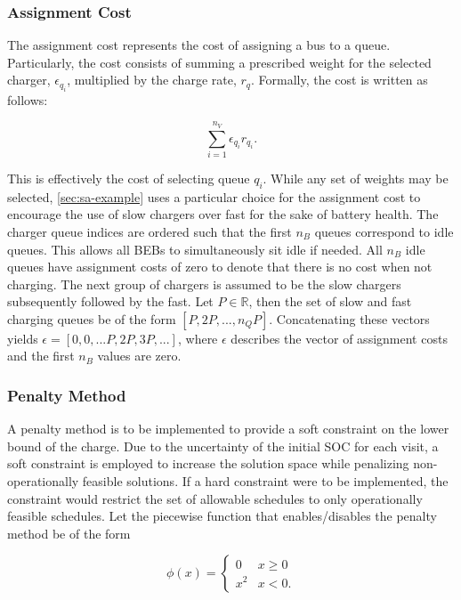 \documentclass[energies,article,submit,moreauthors]{Definitions/mdpi}
\begin{document}
\subsubsection{Assignment Cost}
\label{sec:sa-assignment-cost}
The assignment cost represents the cost of assigning a bus to a queue. Particularly, the cost consists of summing a
prescribed weight for the selected charger, \(\epsilon_{q_i}\), multiplied by the charge rate, \(r_q\). Formally, the cost is
written as follows:

\begin{equation}
\label{eq:assignment-cost}
\sum_{i=1}^{n_V} \epsilon_{q_i}r_{q_i}\text{.}
\end{equation}

This is effectively the cost of selecting queue \(q_i\). While any set of weights may be selected, \ref{sec:sa-example} uses a
particular choice for the assignment cost to encourage the use of slow chargers over fast for the sake of battery
health. The charger queue indices are ordered such that the first \(n_B\) queues correspond to idle queues. This allows
all BEBs to simultaneously sit idle if needed. All \(n_B\) idle queues have assignment costs of zero to denote that there
is no cost when not charging. The next group of chargers is assumed to be the slow chargers subsequently followed by the
fast. Let \(P \in \mathbb{R}\), then the set of slow and fast charging queues be of the form \([P, 2P, ..., n_QP]\). Concatenating
these vectors yields \(\epsilon = [0, 0, ... P, 2P, 3P, ...]\), where \(\epsilon\) describes the vector of assignment costs and the first
\(n_B\) values are zero.

\subsubsection{Penalty Method}
\label{sec:sa-penalty-method}
A penalty method is to be implemented to provide a soft constraint on the lower bound of the charge. Due to the
uncertainty of the initial SOC for each visit, a soft constraint is employed to increase the solution space while
penalizing non-operationally feasible solutions. If a hard constraint were to be implemented, the constraint would
restrict the set of allowable schedules to only operationally feasible schedules. Let the piecewise function that
enables/disables the penalty method be of the form

\begin{equation}
\label{eq:penalty}
  \phi(x) =
  \begin{cases}
    0   & x \ge 0 \\
    x^2 & x < 0\text{.}
  \end{cases}
\end{equation}
\end{document}
